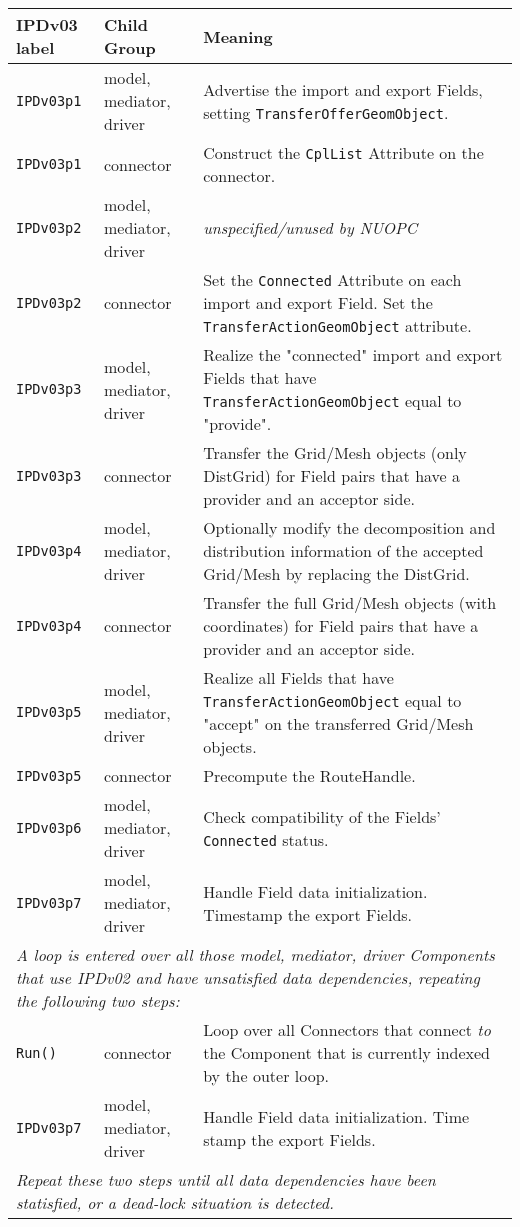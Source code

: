 \vspace*{3ex}
\begin{tabular}[h]{|p{35mm}|p{4cm}|p{6cm}|}
     \hline\hline
     {\bf IPDv03 label} & {\bf Child Group} & {\bf Meaning}\\
     \hline\hline
     {\tt IPDv03p1} & model, mediator, driver & Advertise the import and export Fields, setting {\tt TransferOfferGeomObject}.\\ \hline
     {\tt IPDv03p1} & connector               & Construct the {\tt CplList} Attribute on the connector.\\ \hline
     {\tt IPDv03p2} & model, mediator, driver & {\em unspecified/unused by NUOPC}\\ \hline
     {\tt IPDv03p2} & connector               & Set the {\tt Connected} Attribute on each import and export Field. Set the {\tt TransferActionGeomObject} attribute.\\ \hline
     {\tt IPDv03p3} & model, mediator, driver & Realize the "connected" import and export Fields that have {\tt TransferActionGeomObject} equal to "provide".\\ \hline
     {\tt IPDv03p3} & connector               & Transfer the Grid/Mesh objects (only DistGrid) for Field pairs that have a provider and an acceptor side.\\ \hline
     {\tt IPDv03p4} & model, mediator, driver & Optionally modify the decomposition and distribution information of the accepted Grid/Mesh by replacing the DistGrid.\\ \hline
     {\tt IPDv03p4} & connector               & Transfer the full Grid/Mesh objects (with coordinates) for Field pairs that have a provider and an acceptor side.\\ \hline
     {\tt IPDv03p5} & model, mediator, driver & Realize all Fields that have {\tt TransferActionGeomObject} equal to "accept" on the transferred Grid/Mesh objects.\\ \hline
     {\tt IPDv03p5} & connector               & Precompute the RouteHandle.\\ \hline
     {\tt IPDv03p6} & model, mediator, driver & Check compatibility of the Fields' {\tt Connected} status.\\ \hline
     {\tt IPDv03p7} & model, mediator, driver & Handle Field data initialization. Timestamp the export Fields.\\ \hline
     \multicolumn{3}{|p{13.5cm}|}{\it A loop is entered over all those model, mediator, driver Components that use IPDv02 and have
     unsatisfied data dependencies, repeating the following two steps:}\\ \hline
     {\tt Run()}    & connector               & Loop over all Connectors that connect {\it to} the Component that is currently indexed by the outer loop.\\ \hline
     {\tt IPDv03p7} & model, mediator, driver & Handle Field data initialization. Time stamp the export Fields.\\ \hline
     \multicolumn{3}{|p{13.5cm}|}{\it Repeat these two steps until all data
     dependencies have been statisfied, or a dead-lock situation is detected.}\\ 
     \hline\hline
\end{tabular}\newline
